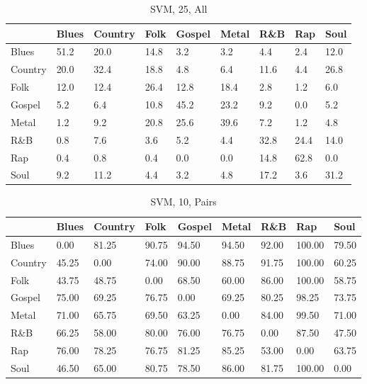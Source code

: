 \documentclass[a4paper,oneside]{article}
\begin{document}
\begin{table}[H]
\caption{SVM, 25, All}
\begin{tabu}{l|*{8}{l}}
 & Blues & Country & Folk & Gospel & Metal & R\&B & Rap & Soul \\ \hline
Blues & 51.2 & 20.0 & 14.8 & 3.2 & 3.2 & 4.4 & 2.4 & 12.0 \\
Country & 20.0 & 32.4 & 18.8 & 4.8 & 6.4 & 11.6 & 4.4 & 26.8 \\
Folk & 12.0 & 12.4 & 26.4 & 12.8 & 18.4 & 2.8 & 1.2 & 6.0 \\
Gospel & 5.2 & 6.4 & 10.8 & 45.2 & 23.2 & 9.2 & 0.0 & 5.2 \\
Metal & 1.2 & 9.2 & 20.8 & 25.6 & 39.6 & 7.2 & 1.2 & 4.8 \\
R\&B & 0.8 & 7.6 & 3.6 & 5.2 & 4.4 & 32.8 & 24.4 & 14.0 \\
Rap & 0.4 & 0.8 & 0.4 & 0.0 & 0.0 & 14.8 & 62.8 & 0.0 \\
Soul & 9.2 & 11.2 & 4.4 & 3.2 & 4.8 & 17.2 & 3.6 & 31.2 \\
\end{tabu}
\end{table}

\begin{table}[H]
\caption{SVM, 10, Pairs}
\begin{tabu}{l|*{8}{l}}
 & Blues & Country & Folk & Gospel & Metal & R\&B & Rap & Soul \\ \hline
Blues & 0.00 & 81.25 & 90.75 & 94.50 & 94.50 & 92.00 & 100.00 & 79.50 \\
Country & 45.25 & 0.00 & 74.00 & 90.00 & 88.75 & 91.75 & 100.00 & 60.25 \\
Folk & 43.75 & 48.75 & 0.00 & 68.50 & 60.00 & 86.00 & 100.00 & 58.75 \\
Gospel & 75.00 & 69.25 & 76.75 & 0.00 & 69.25 & 80.25 & 98.25 & 73.75 \\
Metal & 71.00 & 65.75 & 69.50 & 63.25 & 0.00 & 84.00 & 99.50 & 71.00 \\
R\&B & 66.25 & 58.00 & 80.00 & 76.00 & 76.75 & 0.00 & 87.50 & 47.50 \\
Rap & 76.00 & 78.25 & 76.75 & 81.25 & 85.25 & 53.00 & 0.00 & 63.75 \\
Soul & 46.50 & 65.00 & 80.75 & 78.50 & 86.00 & 81.75 & 100.00 & 0.00
\end{tabu}
\end{table}
\end{document}
